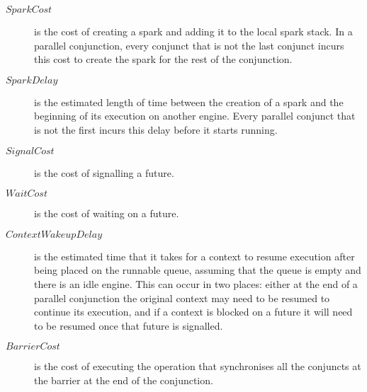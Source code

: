 \begin{description}
\item[$SparkCost$]
is the cost of creating a spark and adding it to the local spark stack.
In a parallel conjunction,
every conjunct that is not the last conjunct incurs this cost
to create the spark for the rest of the conjunction.
\item[$SparkDelay$]
is the estimated length of time between the creation of a spark
and the beginning of its execution on another engine.
Every parallel conjunct that is not the first incurs this delay
before it starts running.
\item[$SignalCost$]
is the cost of signalling a future.
\item[$WaitCost$]
is the cost of waiting on a future.
\item[$ContextWakeupDelay$]
is the estimated time that it takes for a context to resume execution
after being placed on the runnable queue,
assuming that the queue is empty and there is an idle engine.
This can occur in two places:
either at the end of a parallel conjunction the original context may need to
be resumed to continue its execution,
and if a context is blocked on a future it will need to be resumed
once that future is signalled.
\item[$BarrierCost$]
is the cost of executing the operation
that synchronises all the conjuncts at the barrier
at the end of the conjunction.
\end{description}


